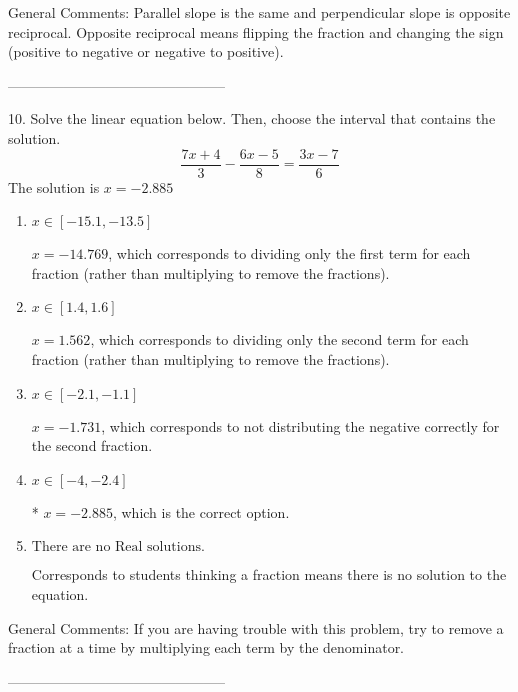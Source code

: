 \documentclass{extbook}[14pt]
\begin{document}
General Comments: Parallel slope is the same and perpendicular slope is opposite reciprocal. Opposite reciprocal means flipping the fraction and changing the sign (positive to negative or negative to positive).

-----------------------------------------------

10. Solve the linear equation below. Then, choose the interval that contains the solution.
\[ \frac{7 x + 4}{3} - \frac{6 x - 5}{8} = \frac{3 x - 7}{6} \] 
The solution is $ x = -2.885 $ 

\begin{enumerate}[label=\Alph*.] 
\item $ x \in [-15.1, -13.5] $ 

  $x = -14.769$, which corresponds to dividing only the first term for each fraction (rather than multiplying to remove the fractions). 
\item $ x \in [1.4, 1.6] $ 

  $x = 1.562$, which corresponds to dividing only the second term for each fraction (rather than multiplying to remove the fractions). 
\item $ x \in [-2.1, -1.1] $ 

  $x = -1.731$, which corresponds to not distributing the negative correctly for the second fraction. 
\item $ x \in [-4, -2.4] $ 

 * $x = -2.885$, which is the correct option. 
\item $ \text{There are no Real solutions.} $ 

 Corresponds to students thinking a fraction means there is no solution to the equation. 
\end{enumerate} 
 
General Comments: If you are having trouble with this problem, try to remove a fraction at a time by multiplying each term by the denominator.

-----------------------------------------------
\end{document}
